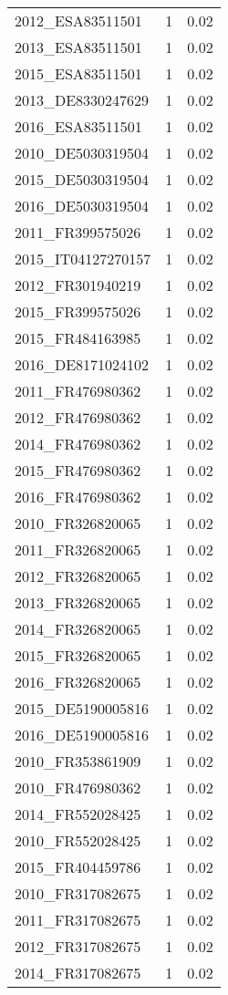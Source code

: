 \begin{table*}[htbp]
\begin{tabular}{lrr}
2012_ESA83511501 & 1 & 0.02 \\
2013_ESA83511501 & 1 & 0.02 \\
2015_ESA83511501 & 1 & 0.02 \\
2013_DE8330247629 & 1 & 0.02 \\
2016_ESA83511501 & 1 & 0.02 \\
2010_DE5030319504 & 1 & 0.02 \\
2015_DE5030319504 & 1 & 0.02 \\
2016_DE5030319504 & 1 & 0.02 \\
2011_FR399575026 & 1 & 0.02 \\
2015_IT04127270157 & 1 & 0.02 \\
2012_FR301940219 & 1 & 0.02 \\
2015_FR399575026 & 1 & 0.02 \\
2015_FR484163985 & 1 & 0.02 \\
2016_DE8171024102 & 1 & 0.02 \\
2011_FR476980362 & 1 & 0.02 \\
2012_FR476980362 & 1 & 0.02 \\
2014_FR476980362 & 1 & 0.02 \\
2015_FR476980362 & 1 & 0.02 \\
2016_FR476980362 & 1 & 0.02 \\
2010_FR326820065 & 1 & 0.02 \\
2011_FR326820065 & 1 & 0.02 \\
2012_FR326820065 & 1 & 0.02 \\
2013_FR326820065 & 1 & 0.02 \\
2014_FR326820065 & 1 & 0.02 \\
2015_FR326820065 & 1 & 0.02 \\
2016_FR326820065 & 1 & 0.02 \\
2015_DE5190005816 & 1 & 0.02 \\
2016_DE5190005816 & 1 & 0.02 \\
2010_FR353861909 & 1 & 0.02 \\
2010_FR476980362 & 1 & 0.02 \\
2014_FR552028425 & 1 & 0.02 \\
2010_FR552028425 & 1 & 0.02 \\
2015_FR404459786 & 1 & 0.02 \\
2010_FR317082675 & 1 & 0.02 \\
2011_FR317082675 & 1 & 0.02 \\
2012_FR317082675 & 1 & 0.02 \\
2014_FR317082675 & 1 & 0.02 \\

\end{tabular}
\end{table*}
